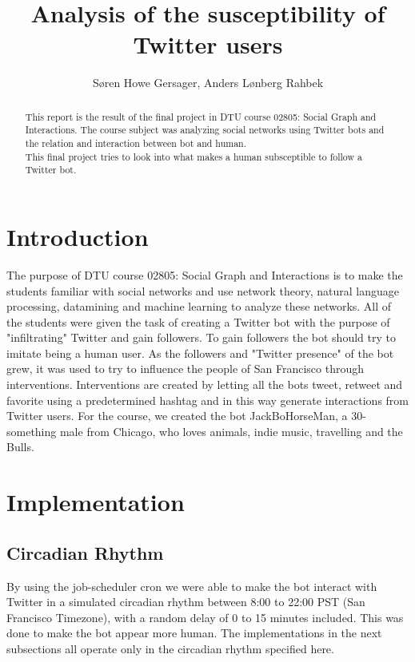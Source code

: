 \documentclass[10pt]{IEEEtran}
\title{Analysis of the susceptibility of Twitter users}
\author{Søren Howe Gersager, Anders Lønberg Rahbek}
\begin{document}
\maketitle

\begin{abstract}
This report is the result of the final project in DTU course 02805: Social Graph and Interactions. The course subject was analyzing social networks using Twitter bots and the relation and interaction between bot and human. \\
This final project tries to look into what makes a human subsceptible to follow a Twitter bot.
\end{abstract}

\section{Introduction}
The purpose of DTU course 02805: Social Graph and Interactions is to make the students familiar with social networks and use network theory, natural language processing, datamining and machine learning to analyze these networks. All of the students were given the task of creating a Twitter bot with the purpose of "infiltrating" Twitter and gain followers. To gain followers the bot should try to imitate being a human user. As the followers and "Twitter presence" of the bot grew, it was used to try to influence the people of San Francisco through interventions. Interventions are created by letting all the bots tweet, retweet and favorite using a predetermined hashtag and in this way generate interactions from Twitter users. For the course, we created the bot JackBoHorseMan\cite{twitterprofile}, a 30-something male from Chicago, who loves animals, indie music, travelling and the Bulls.

\section{Implementation}
\subsection{Circadian Rhythm}
By using the job-scheduler cron we were able to make the bot interact with Twitter in a simulated circadian rhythm between 8:00 to 22:00 PST (San Francisco Timezone), with a random delay of 0 to 15 minutes included. This was done to make the bot appear more human.
The implementations in the next subsections all operate only in the circadian rhythm specified here.
\end{document}
